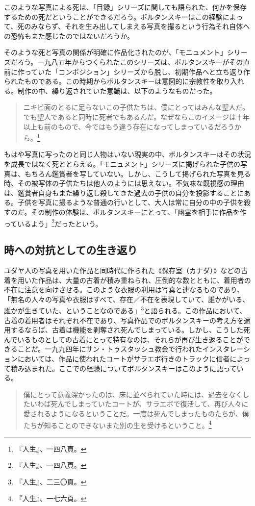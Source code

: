 \documentclass[b5j,twoside,twocolumn]{utarticle}
\newcommand{\mysubsection}[1]{\vspace{-6mm}\subsection{#1}\vspace{-2mm}}
\begin{document}
このような写真による死は、「目録」シリーズに関しても語られた、何かを保存するための死だということができるだろう。ボルタンスキーはこの経験によって、死のみならず、それを生み出してしまえる写真を撮るという行為それ自体への恐怖もまた感じたのではないだろうか。


そのような死と写真の関係が明確に作品化されたのが、「モニュメント」シリーズだろう。一九八五年からつくられたこのシリーズは、ボルタンスキーがその直前に作っていた「コンポジション」シリーズから脱し、初期作品へと立ち返り作られたものである。この時期からボルタンスキーは意図的に宗教性を取り入れる。制作の中、繰り返されていた意識は、以下のようなものだった。
\begin{quote}
ニキビ面のとるに足らないこの子供たちは、僕にとってはみんな聖人だ。でも聖人であると同時に死者でもあるんだ。なぜならこのイメージは十年以上も前のもので、今ではもう違う存在になってしまっているだろうから。\footnote{『人生』、一四八頁。}
\end{quote}


もはや写真に写ったのと同じ人物はいない現実の中、ボルタンスキーはその状況を成長ではなく死ととらえる。「モニュメント」シリーズに掲げられた子供の写真は、もちろん鑑賞者を写していない。しかし、こうして掲げられた写真を見る時、その被写体の子供たちは他人のようには思えない。不気味な既視感の理由は、鑑賞者自身もまた繰り返し殺してきた過去の子供の自分を投影することにある。子供を写真に撮るような普通の行いとして、大人は常に自分の中の子供を殺すのだ。その制作の体験は、ボルタンスキーにとって、「幽霊を相手に作品を作っているよう」\footnote{『人生』、一四八頁。}だったという。

\mysubsection{時への対抗としての生き返り}
ユダヤ人の写真を用いた作品と同時代に作られた《保存室（カナダ）》などの古着を用いた作品は、大量の古着が積み重ねられ、圧倒的な数とともに、着用者の不在に注意を向けさせる。このような衣服の利用は写真と連なるものであり、「無名の人々の写真や衣服はすべて、存在／不在を表現していて、誰かがいる、誰かが生きていた、ということなのである」\footnote{『人生』、二三〇頁。}と語られる。この作品において、古着の着用者はそれぞれ不在であり、写真作品でのボルタンスキーの考え方を適用するならば、古着は機能を剥奪され死んでしまっている。しかし、こうした死んでいるものとしての古着にとって特有なのは、それらが再び生き返ることができることだ。一九九四年にサン・トゥスタッシュ教会で行われたインスタレーションにおいては、作品に使われたコートがサラエボ行きのトラックに信者によって積み込まれた。ここでの経験についてボルタンスキーはこのように語っている。

\begin{quote}
僕にとって意義深かったのは、床に並べられていた時には、過去をなくしたいわば死んでしまっていたコートが、サラエボで復活して、再び人々に愛されるようになるということだ。一度は死んでしまったものたちが、僕たちが知ることのできないまた別の生を受けるということ。\footnote{『人生』、一七六頁。}
\end{quote}
\end{document}
